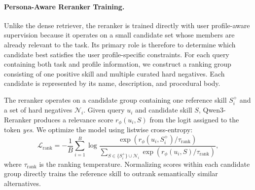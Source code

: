 \documentclass[letterpaper]{article} %
\begin{document}




\paragraph{Persona-Aware Reranker Training.}
Unlike the dense retriever, the reranker is trained directly with user profile-aware supervision because it operates on a small candidate set whose members are already relevant to the task. Its primary role is therefore to determine which candidate best satisfies the user profile-specific constraints. For each query containing both task and profile information, we construct a ranking group consisting of one positive skill and multiple curated hard negatives. Each candidate is represented by its name, description, and procedural body.


The reranker operates on a candidate group containing one reference skill
$S_i^{+}$ and a set of hard negatives $\mathcal{N}_i$. Given query $u_i$
and candidate skill $S$, Qwen3-Reranker produces a relevance score
$r_{\phi}(u_i,S)$ from the logit assigned to the token \textit{yes}.
We optimize the model using listwise cross-entropy:
\begin{equation}
\mathcal{L}_{\mathrm{rank}}
=
-\frac{1}{B}
\sum_{i=1}^{B}
\log
\frac{
\exp\!\left(
r_{\phi}(u_i,S_i^{+})/\tau_{\mathrm{rank}}
\right)
}{
\sum\limits_{S\in\{S_i^{+}\}\cup\mathcal{N}_i}
\exp\!\left(
r_{\phi}(u_i,S)/\tau_{\mathrm{rank}}
\right)
},
\label{eq:app_reranker_loss}
\end{equation}
where $\tau_{\mathrm{rank}}$ is the ranking temperature. Normalizing scores
within each candidate group directly trains the reference skill to outrank
semantically similar alternatives.
\end{document}
